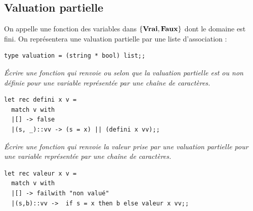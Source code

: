\subsection{Valuation partielle}
On appelle  une fonction des variables dans $\{{\bf Vrai}, {\bf Faux}\}$ dont le domaine est fini. 
On représentera une valuation partielle par une liste d'association :
\begin{lstlisting}
type valuation = (string * bool) list;;
\end{lstlisting}
\begin{Exercise}\it 
Écrire une fonction  qui renvoie  ou  selon que la valuation partielle est ou non définie pour une variable représentée par une chaîne de caractères.
\end{Exercise}
\begin{Answer} 

\begin{lstlisting}
let rec defini x v = 
  match v with
  |[] -> false
  |(s, _)::vv -> (s = x) || (defini x vv);;
\end{lstlisting}
\end{Answer}
\begin{Exercise}\it 
Écrire une fonction  qui renvoie la valeur prise par une  valuation partielle pour une variable représentée par une chaîne de caractères.
\end{Exercise}
\begin{Answer} 

\begin{lstlisting}
let rec valeur x v =
  match v with
  |[] -> failwith "non valué"
  |(s,b)::vv ->  if s = x then b else valeur x vv;;
\end{lstlisting}
\end{Answer}

